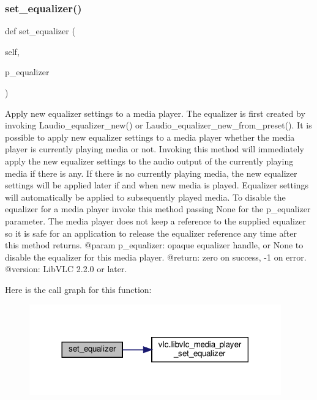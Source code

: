 \subsubsection{\texorpdfstring{set\+\_\+equalizer()}{set\_equalizer()}}
{\footnotesize\ttfamily def set\+\_\+equalizer (\begin{DoxyParamCaption}\item[{}]{self,  }\item[{}]{p\+\_\+equalizer }\end{DoxyParamCaption})}

\begin{DoxyVerb}Apply new equalizer settings to a media player.
The equalizer is first created by invoking L{audio_equalizer_new}() or
L{audio_equalizer_new_from_preset}().
It is possible to apply new equalizer settings to a media player whether the media
player is currently playing media or not.
Invoking this method will immediately apply the new equalizer settings to the audio
output of the currently playing media if there is any.
If there is no currently playing media, the new equalizer settings will be applied
later if and when new media is played.
Equalizer settings will automatically be applied to subsequently played media.
To disable the equalizer for a media player invoke this method passing None for the
p_equalizer parameter.
The media player does not keep a reference to the supplied equalizer so it is safe
for an application to release the equalizer reference any time after this method
returns.
@param p_equalizer: opaque equalizer handle, or None to disable the equalizer for this media player.
@return: zero on success, -1 on error.
@version: LibVLC 2.2.0 or later.
\end{DoxyVerb}
 Here is the call graph for this function\+:
\nopagebreak
\begin{figure}[H]
\begin{center}
\leavevmode
\includegraphics[width=308pt]{classvlc_1_1_media_player_a161a0eb8d93f38fa2204be0c3a51bdbd_cgraph}
\end{center}
\end{figure}
\mbox{\label{classvlc_1_1_media_player_ad03f3853ac2685e1a62ca0f98121a1df}} 
